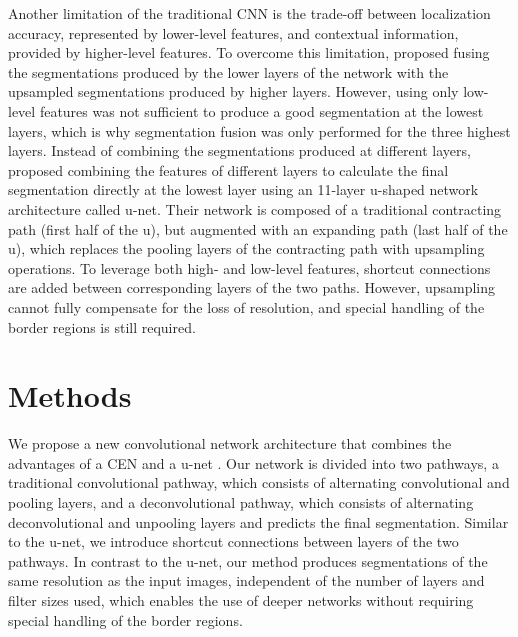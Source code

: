 Another limitation of the traditional CNN is the trade-off between localization
accuracy, represented by lower-level features, and contextual information,
provided by higher-level features. To overcome this limitation, \citet{long2015}
proposed fusing the segmentations produced by the lower layers of the network
with the upsampled segmentations produced by higher layers. However, using only
low-level features was not sufficient to produce a good segmentation at the
lowest layers, which is why segmentation fusion was only performed for the three
highest layers. Instead of combining the segmentations produced at different
layers, \citet{ronneberger2015} proposed combining the features of different
layers to calculate the final segmentation directly at the lowest layer using an
11-layer u-shaped network architecture called u-net. Their network is composed
of a traditional contracting path (first half of the u), but augmented with an
expanding path (last half of the u), which replaces the pooling layers of the
contracting path with upsampling operations. To leverage both high- and
low-level features, shortcut connections are added between corresponding layers
of the two paths. However, upsampling cannot fully compensate for the loss of
resolution, and special handling of the border regions is still required.


\section{Methods}
\label{sec:method}

We propose a new convolutional network architecture that combines the advantages
of a CEN \citep{brosch2015} and a u-net \citep{ronneberger2015}. Our network is
divided into two pathways, a traditional convolutional pathway, which consists
of alternating convolutional and pooling layers, and a deconvolutional pathway,
which consists of alternating deconvolutional and unpooling layers and predicts
the final segmentation. Similar to the u-net, we introduce shortcut connections
between layers of the two pathways. In contrast to the u-net, our method
produces segmentations of the same resolution as the input images, independent
of the number of layers and filter sizes used, which enables the use of deeper
networks without requiring special handling of the border regions.

